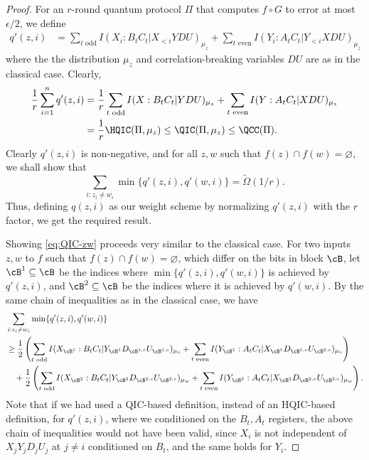 \begin{proof}
For an $r$-round quantum protocol $\Pi$ that computes $f\circ G$ to error at most $\epsilon/2$, we define
\begin{align*}
q'(z,i) & = \sum_{t\text{ odd}}I(X_i:B_tC_t|X_{<i}YDU)_{\mu_z} + \sum_{t\text{ even}}I(Y_i:A_tC_t|Y_{<i}XDU)_{\mu_z}
\end{align*}
where the the distribution $\mu_z$ and correlation-breaking variables $DU$ are as in the classical case. Clearly,
\begin{align*}
\frac{1}{r}\sum_{i=1}^n q'(z,i) & = \frac{1}{r} \sum_{t\text{ odd}}I(X:B_tC_t|YDU)_{\mu_z} + \sum_{t\text{ even}}I(Y:A_tC_t|XDU)_{\mu_z} \\
& = \frac{1}{r}\HQIC(\Pi,\mu_z) \leq \QIC(\Pi,\mu_z) \leq \QCC(\Pi).
\end{align*}
Clearly $q'(z,i)$ is non-negative, and for all $z,w$ such that $f(z)\cap f(w) = \varnothing$, we shall show that
\begin{equation}\label{eq:QIC-zw} \sum_{i:z_i\neq w_i}\min\{q'(z,i),q'(w,i)\} = \widetilde{\Omega}(1/r).\end{equation}
Thus, defining $q(z,i)$ as our weight scheme by normalizing $q'(z,i)$ with the $r$ factor, we get the required result.

Showing \eqref{eq:QIC-zw} proceeds very similar to the classical case. For two inputs $z, w$ to $f$ such that $f(z) \cap f(w) = \varnothing$, which differ on the bits in block $\cB$, let $\cB^1 \subseteq \cB$ be the indices where $\min\{q'(z,i), q'(w,i)\}$ is achieved by $q'(z,i)$, and $\cB^2 \subseteq \cB$ be the indices where it is achieved by $q'(w,i)$. By the same chain of inequalities as in the classical case, we have
\begin{align*}
& \sum_{i:z_i\neq w_i}\min\{q'(z,i), q'(w,i)\} \\
& \geq \frac{1}{2}\left(\sum_{t\text{ odd}}I(X_{\cB^1}:B_tC_t|Y_{\cB^1}D_{\cB^{1,c}}U_{\cB^{1,c}})_{\mu_z} + \sum_{t\text{ even}}I(Y_{\cB^1}:A_tC_t|X_{\cB^1}D_{\cB^{1,c}}U_{\cB^{2,c}})_{\mu_z}\right) \\
& \quad + \frac{1}{2}\left(\sum_{t\text{ odd}}I(X_{\cB^2}:B_tC_t|Y_{\cB^2}D_{\cB^{2,c}}U_{\cB^{2,c}})_{\mu_w} + \sum_{t\text{ even}}I(Y_{\cB^2}:A_tC_t|X_{\cB^2}D_{\cB^{2,c}}U_{\cB^{2,c}})_{\mu_w}\right).
\end{align*}
Note that if we had used a QIC-based definition, instead of an HQIC-based definition, for $q'(z,i)$, where we conditioned on the $B_t, A_t$ registers, the above chain of inequalities would not have been valid, since $X_i$ is not independent of $X_jY_jD_jU_j$ at $j\neq i$ conditioned on $B_t$, and the same holds for $Y_i$.


\end{proof}
